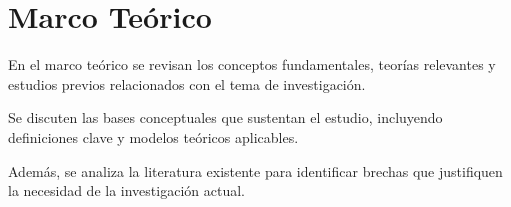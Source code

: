 \section{Marco Teórico}
\label{sec:marco_teorico}

En el marco teórico se revisan los conceptos fundamentales, teorías relevantes y estudios previos relacionados con el tema de investigación.

Se discuten las bases conceptuales que sustentan el estudio, incluyendo definiciones clave y modelos teóricos aplicables.

Además, se analiza la literatura existente para identificar brechas que justifiquen la necesidad de la investigación actual.